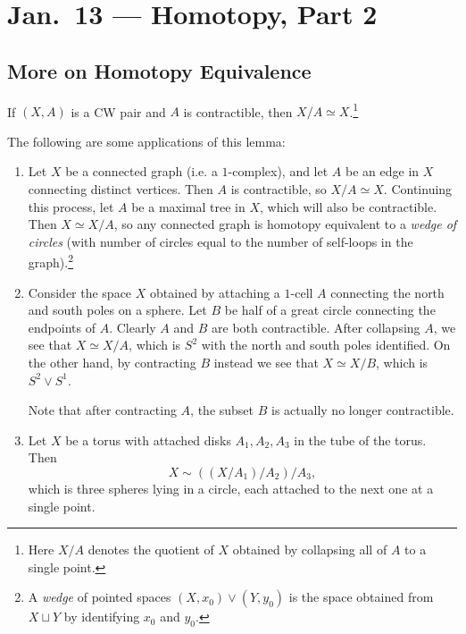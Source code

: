 \chapter{Jan.~13 --- Homotopy, Part 2}

\section{More on Homotopy Equivalence}
\begin{lemma}\label{lem:lemma-2}
  If $(X, A)$ is a CW pair and $A$ is contractible,
  then $X / A \simeq X$.\footnote{Here $X / A$ denotes
  the quotient of $X$ obtained by collapsing all of $A$
  to a single point.}
\end{lemma}

\begin{exercise}
  The following are some applications of this lemma:
  \begin{enumerate}
    \item Let $X$ be a connected graph (i.e. a
      $1$-complex), and let $A$ be an edge in $X$
      connecting distinct vertices. Then $A$ is
      contractible, so $X / A \simeq X$.
      Continuing this process, let $A$ be a maximal
      tree in $X$, which will also be contractible.
      Then $X \simeq X / A$, so any connected graph is
      homotopy equivalent to a \emph{wedge of circles}
      (with number of circles equal to the number of
      self-loops in the graph).\footnote{A \emph{wedge} of pointed spaces $(X, x_0) \lor (Y, y_0)$ is the space obtained from $X \sqcup Y$ by identifying $x_0$ and $y_0$.}
    \item Consider the space $X$ obtained by attaching
      a $1$-cell $A$ connecting the north and south
      poles on a sphere. Let $B$ be half of a great
      circle
      connecting the endpoints of $A$. Clearly $A$ and
      $B$ are both contractible. After collapsing
      $A$, we see that $X \simeq X / A$, which is
      $S^2$ with the north and south poles identified.
      On the other hand, by contracting $B$ instead
      we see that $X \simeq X / B$, which is
      $S^2 \lor S^1$.

      Note that after contracting $A$,
      the subset $B$ is actually no longer contractible.
    \item Let $X$ be a torus with attached disks
      $A_1, A_2, A_3$ in the tube of the torus.
      Then
      \[X \sim ((X / A_1) / A_2) / A_3,\]
      which is three spheres lying in a circle, each
      attached to the next one at a single point.


\end{enumerate}
\end{exercise}
